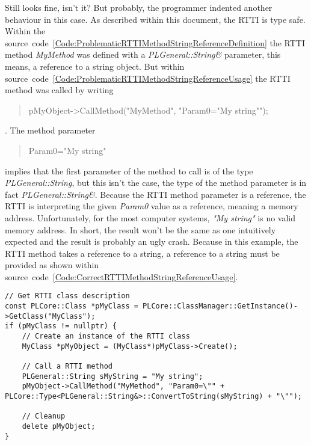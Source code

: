 Still looks fine, isn't it? But probably, the programmer indented another behaviour in this case. As described within this document, the RTTI is type safe. Within the source~code~\ref{Code:ProblematicRTTIMethodStringReferenceDefinition} the RTTI method \emph{MyMethod} was defined with a \emph{PLGeneral::String\&} parameter, this means, a reference to a string object. But within source~code~\ref{Code:ProblematicRTTIMethodStringReferenceUsage} the RTTI method was called by writing \begin{quote}pMyObject->CallMethod("MyMethod", "Param0="My string"");\end{quote}. The method parameter \begin{quote}Param0="My string"\end{quote} implies that the first parameter of the method to call is of the type \emph{PLGeneral::String}, but this isn't the case, the type of the method parameter is in fact \emph{PLGeneral::String\&}. Because the RTTI method parameter is a reference, the RTTI is interpreting the given \emph{Param0} value as a reference, meaning a memory address. Unfortunately, for the most computer systems, \emph{"My string"} is no valid memory address. In short, the result won't be the same as one intuitively expected and the result is probably an ugly crash. Because in this example, the RTTI method takes a reference to a string, a reference to a string must be provided as shown within source~code~\ref{Code:CorrectRTTIMethodStringReferenceUsage}.
\begin{lstlisting}[label=Code:CorrectRTTIMethodStringReferenceUsage,caption={Correct RTTI method and string reference parameter usage}]
// Get RTTI class description
const PLCore::Class *pMyClass = PLCore::ClassManager::GetInstance()->GetClass("MyClass");
if (pMyClass != nullptr) {
	// Create an instance of the RTTI class
	MyClass *pMyObject = (MyClass*)pMyClass->Create();

	// Call a RTTI method
	PLGeneral::String sMyString = "My string";
	pMyObject->CallMethod("MyMethod", "Param0=\"" + PLCore::Type<PLGeneral::String&>::ConvertToString(sMyString) + "\"");

	// Cleanup
	delete pMyObject;
}
\end{lstlisting}

